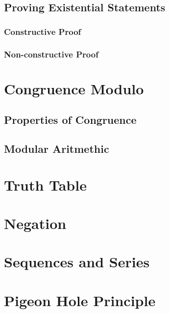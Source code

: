 \documentclass[a4paper]{article}
\begin{document}
\subsection{Proving Existential Statements}

\subsubsection{Constructive Proof}

\subsubsection{Non-constructive Proof}

\section{Congruence Modulo}

\subsection{Properties of Congruence}

\subsection{Modular Aritmethic}

\section{Truth Table}

\section{Negation}

\section{Sequences and Series}

\section{Pigeon Hole Principle}
\end{document}
